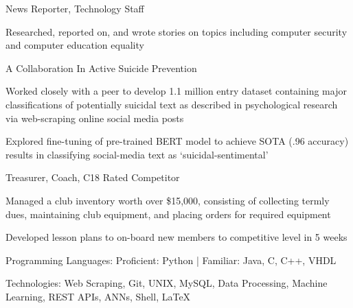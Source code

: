 \documentclass{practical-type-resume}
\begin{document}
	\begin{position}{News Reporter, Technology Staff}{}
		\item Researched, reported on, and wrote stories on topics including computer security and computer education equality
	\end{position}

	\begin{position}{A Collaboration In Active Suicide Prevention}{}
	\item Worked closely with a peer to develop 1.1 million entry dataset containing major classifications of potentially suicidal text as described in psychological research via web-scraping online social media posts
	\item Explored fine-tuning of pre-trained BERT model to achieve SOTA (.96 accuracy) results in classifying social-media text as ‘suicidal-sentimental’
	\end{position}

	\begin{position}{Treasurer, Coach, C18  Rated Competitor}{}
	\item Managed a club inventory worth over \$15,000, consisting of collecting termly dues, maintaining club equipment, and placing orders for required equipment
	\item Developed lesson plans to on-board new members to competitive level in 5 weeks
	\end{position}

\vspace{-1em}
	Programming Languages: Proficient: Python | Familiar: Java, C, C++, VHDL
	
	Technologies: Web Scraping, Git, UNIX, MySQL, Data Processing, Machine Learning, REST APIs, ANNs, Shell, \LaTeX
\end{document}
